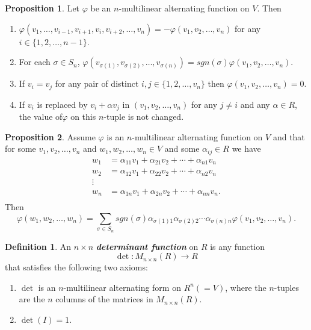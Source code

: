 \documentclass[10pt]{article}
\theoremstyle{definition}
\newtheorem*{prop}{Proposition}
\newtheorem*{defn}{Definition}
\newcommand{\nl}{\vspace{7em}}
\newcommand{\ra}{\rightarrow}
\newcommand{\al}{\alpha}
\newcommand{\vphi}{\varphi}
\begin{document}
\begin{prop}
Let $\vphi$ be an $n$-multilinear alternating function on $V$. Then 
\begin{enumerate}
\item $\vphi(v_1,\ldots, v_{i-1}, v_{i + 1}, v_i, v_{i + 2}, \ldots, v_n) = -\vphi(v_1, v_2, \ldots, v_n)$ for any $i\in \{1,2,\ldots, n-1\}$.

\item For each $\sigma\in S_n$, $\vphi(v_{\sigma(1)}, v_{\sigma(2)},\ldots, v_{\sigma(n)}) = sgn(\sigma)\vphi(v_1, v_2, \ldots, v_n)$.

\item If $v_i = v_j$ for any pair of distinct $i,j\in \{1,2,\ldots, v_n\}$ then $\vphi(v_1, v_2, \ldots, v_n) = 0$.

\item If $v_i$ is replaced by $v_i + \al v_j$ in $(v_1,v_2,\ldots,v_n)$ for any $j\neq i$ and any $\al \in R$, the value of$\vphi$ on this $n$-tuple is not changed.
\end{enumerate}
\end{prop}

\nl

\begin{prop}
Assume $\vphi$ is an $n$-multilinear alternating function on $V$ and that for some $v_1,v_2,\ldots,v_n$ and $w_1,w_2,\ldots,w_n\in V$ and some $\al_{ij}\in R$ we have
\begin{align*}
w_1 &= \al_{11}v_1 + \al_{21}v_2 + \cdots + \al_{n1}v_n\\
w_2 &= \al_{12}v_1 + \al_{22}v_2 + \cdots + \al_{n2}v_n\\
\vdots\\
w_n &= \al_{1n}v_1 + \al_{2n}v_2 + \cdots + \al_{nn}v_n.\\
\end{align*}
Then 
\[\vphi(w_1,w_2,\ldots,w_n) = \sum_{\sigma\in S_n} sgn(\sigma)\al_{\sigma(1)1}\al_{\sigma(2)2}\cdots\al_{\sigma(n)n}\vphi(v_1,v_2,\ldots,v_n).\]
\end{prop}

\nl

\begin{defn}
An $n\times n$ \textit{\textbf{determinant function}} on $R$ is any function 
\[\det:M_{n\times n}(R)\ra R\]
that satisfies the following two axioms:
\begin{enumerate}
\item $\det$ is an $n$-multilinear alternating form on $R^n( = V)$, where the $n$-tuples are the $n$ columns of the matrices in $M_{n\times n}(R)$.
\item $\det(I) = 1$.
\end{enumerate}
\end{defn}
\end{document}
